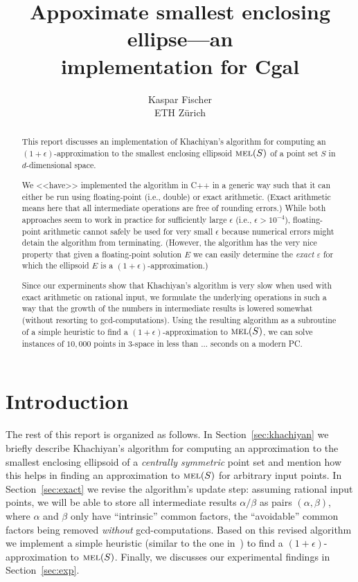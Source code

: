\documentclass[a4paper,twocolumn]{article}
\newcommand{\MEL}{\ensuremath{\mathop{\textnormal{\textsc{mel}}}\nolimits}}
\begin{document}
\title{Appoximate smallest enclosing ellipse---an \\
implementation for {\sc Cgal}}
\author{Kaspar Fischer \\ ETH Z\"urich}
\maketitle

\begin{abstract}
  This report discusses an implementation of Khachiyan's algorithm
  \cite{k-rprnmc-96} for computing an $(1+\epsilon)$-approximation to
  the smallest enclosing ellipsoid $\MEL(S)$ of a point set $S$ in
  $d$-dimensional space.

  We <<have>> implemented the algorithm in C++ in a generic way such that
  it can either be run using floating-point (i.e., double) or exact
  arithmetic.  (Exact arithmetic means here that all intermediate
  operations are free of rounding errors.)  While both approaches seem
  to work in practice for sufficiently large $\epsilon$ (i.e.,
  $\epsilon>10^{-4}$), floating-point arithmetic cannot safely be used
  for very small $\epsilon$ because numerical errors might detain the
  algorithm from terminating.  (However, the algorithm has the very
  nice property that given a floating-point solution $E$ we can easily
  determine the \emph{exact} $\varepsilon$ for which the ellipsoid $E$ is a
  $(1+\epsilon)$-approximation.)

  Since our experminents show that Khachiyan's algorithm is very slow
  when used with exact arithmetic on rational input, we formulate the
  underlying operations in such a way that the growth of the numbers
  in intermediate results is lowered somewhat (without resorting to
  gcd-computations).  Using the resulting algorithm as a subroutine of
  a simple heuristic to find a $(1+\epsilon)$-approximation to
  $\MEL(S)$, we can solve instances of $10,\!000$ points in 3-space in
  less than ... seconds on a modern PC.
\end{abstract}

\section{Introduction}

The rest of this report is organized as follows.  In
Section~\ref{sec:khachiyan} we briefly describe Khachiyan's algorithm
for computing an approximation to the smallest enclosing ellipsoid of
a \emph{centrally symmetric} point set and mention how this helps in
finding an approximation to $\MEL(S)$ for arbitrary input points.  In
Section~\ref{sec:exact} we revise the algorithm's update step:
assuming rational input points, we will be able to store all
intermediate results $\alpha/\beta$ as pairs $(\alpha,\beta)$, where
$\alpha$ and $\beta$ only have ``intrinsic'' common factors, the
``avoidable'' common factors being removed \emph{without}
gcd-computations.  Based on this revised algorithm we implement a
simple heuristic (similar to the one in~\cite{kmy-ccsasehhd-03}) to
find a $(1+\epsilon)$-approximation to $\MEL(S)$.  Finally, we
discusses our experimental findings in Section~\ref{sec:exp}.
\end{document}
